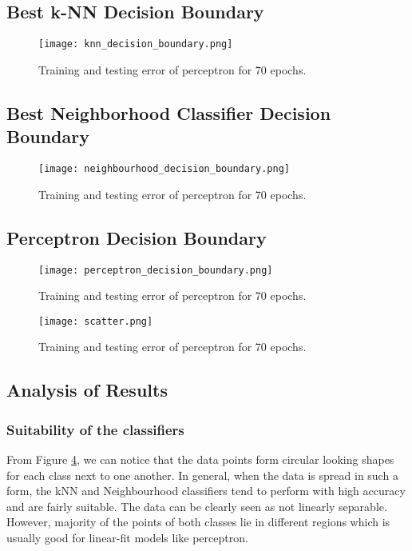 \documentclass[a4paper,11pt]{article}
\begin{document}
\subsection{Best k-NN Decision Boundary}
\begin{figure}[H]
    \centering
    \texttt{[image: knn\_decision\_boundary.png]}
    \caption{Training and testing error of perceptron for 70 epochs.}
    \label{fig:2.1}
\end{figure}

\subsection{Best Neighborhood Classifier Decision Boundary}
\begin{figure}[H]
    \centering
    \texttt{[image: neighbourhood\_decision\_boundary.png]}
    \caption{Training and testing error of perceptron for 70 epochs.}
    \label{fig:2.1}
\end{figure}

\subsection{Perceptron Decision Boundary}
\begin{figure}[H]
    \centering
    \texttt{[image: perceptron\_decision\_boundary.png]}
    \caption{Training and testing error of perceptron for 70 epochs.}
    \label{fig:2.1}
\end{figure}

\begin{figure}[h!]
    \centering
    \texttt{[image: scatter.png]}
    \caption{Training and testing error of perceptron for 70 epochs.}
    \label{fig:3.8}
\end{figure}

\subsection{Analysis of Results}
\subsubsection{Suitability of the classifiers}
From Figure \ref{fig:3.8}, we can notice that the data points form circular looking shapes for each class next to one another. In general, when the data is spread in such a form, the kNN and Neighbourhood classifiers tend to perform with high accuracy and are fairly suitable. The data can be clearly seen as not linearly separable. However, majority of the points of both classes lie in different regions which is usually good for linear-fit models like perceptron.
\end{document}
